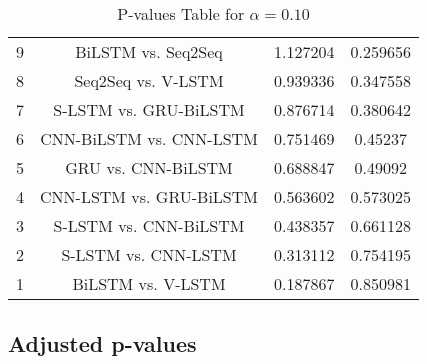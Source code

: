 \documentclass[a4paper,10pt]{article}
\begin{document}
\begin{landscape}
\begin{table}[!htp]
\begin{tabular}{cccc}
9&BiLSTM vs. Seq2Seq&1.127204&0.259656\\
8&Seq2Seq vs. V-LSTM&0.939336&0.347558\\
7&S-LSTM vs. GRU-BiLSTM&0.876714&0.380642\\
6&CNN-BiLSTM vs. CNN-LSTM&0.751469&0.45237\\
5&GRU vs. CNN-BiLSTM&0.688847&0.49092\\
4&CNN-LSTM vs. GRU-BiLSTM&0.563602&0.573025\\
3&S-LSTM vs. CNN-BiLSTM&0.438357&0.661128\\
2&S-LSTM vs. CNN-LSTM&0.313112&0.754195\\
1&BiLSTM vs. V-LSTM&0.187867&0.850981\\
\hline
\end{tabular}
\caption{P-values Table for $\alpha=0.10$}
\end{table}\pagebreak

\subsection{Adjusted p-values}


\end{landscape}
\end{document}
